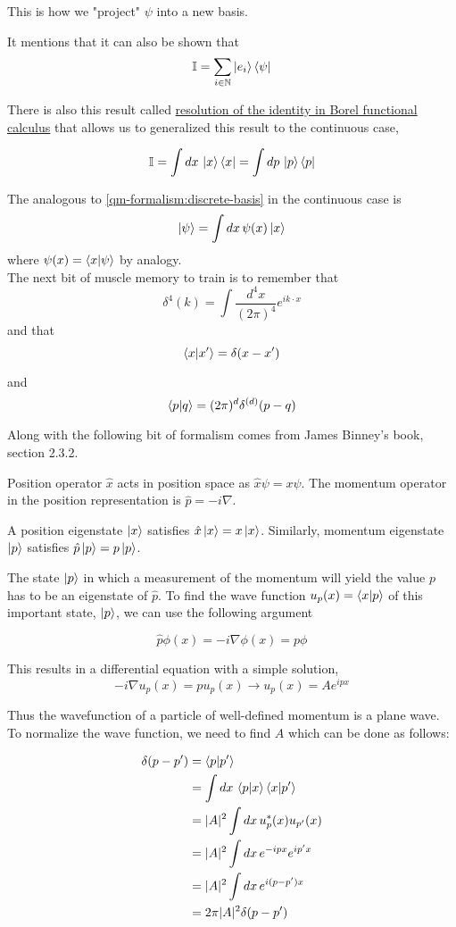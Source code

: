 This is how we "project" $\psi$ into a new basis.

It mentions that it can also be shown that
$$
\mathbb{I} = \sum_{i\in\mathbb{N}} \ket{e_i} \bra{\psi}
$$

There is also this result called
\href{https://en.wikipedia.org/wiki/Borel_functional_calculus#Resolution_of_the_identity}{resolution of the identity in Borel functional calculus}
that allows us to generalized this result to the continuous case,

$$
\mathbb{I} = \int dx \, \ket{x} \bra{x} = \int dp \, \ket{p} \bra{p}
$$


The analogous to \ref{qm-formalism:discrete-basis} in the continuous case is
$$
\ket{\psi} = \int dx\, \psi(x) \ket{x}
$$
where $\psi (x) = \braket{x | \psi}$ by analogy.
\\


The next bit of muscle memory to train is to remember that
$$
\delta^{4} (k) = \int \frac{d^4x}{(2\pi)^4} e^{ik\cdot x}
$$
and that
$$
\braket{x | x^\prime} = \delta(x - x^\prime)
$$

and
$$
\braket{p | q} = (2\pi)^d \delta^{(d)}(p - q)
$$

Along with the following bit of formalism comes from James Binney's book, section 2.3.2.

Position operator $\hat{x}$ acts in position space as $\hat{x} \psi = x\psi$.
The momentum operator in the position representation is $\hat{p} = -i\nabla$.

A position eigenstate $\ket{x}$ satisfies $\hat{x}\ket{x} = x\ket{x}$.
Similarly, momentum eigenstate $\ket{p}$ satisfies $\hat{p}\ket{p} = p\ket{p}$.

The state $\ket{p}$ in which a measurement of the momentum will yield the value $p$ has to be an eigenstate
of $\hat{p}$.
To find the wave function $u_p (x) = \braket{x | p}$ of this important state, $\ket{p}$,
we can use the following argument

$$
\hat{p} \phi(x) = -i\nabla \phi(x) = p\phi
$$

This results in a differential equation with a simple solution,
$$
-i\nabla u_p(x) = p u_p(x) \rightarrow u_p(x) = Ae^{ipx}
$$

Thus the wavefunction of a particle of well-defined momentum is a plane wave.
To normalize the wave function, we need to find $A$ which can be done as follows:

\begin{align*}
\delta(p - p^\prime) &= \braket{p | p^\prime} \\
&= \int dx \, \braket{p | x} \braket{x | p^\prime} \\
&= |A|^2 \int dx \, u_{p}^{*} (x) u_{p^\prime} (x) \\
&= |A|^2 \int dx \, e^{-ipx} e^{ip^\prime x} \\
&= |A|^2 \int dx \, e^{i(p - p^\prime) x} \\
&= 2\pi |A|^2 \delta(p - p^\prime)
\end{align*}

